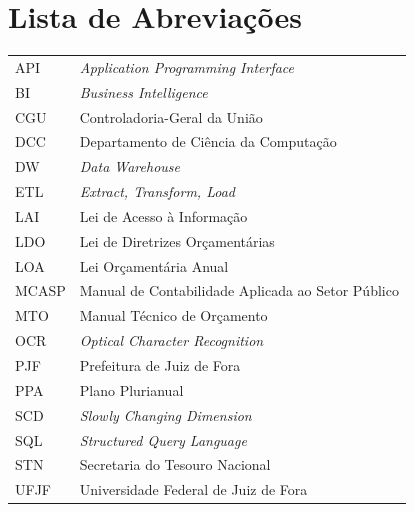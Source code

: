 \documentclass[a4paper,12pt]{monografia}
\theoremstyle{plain}
\theoremstyle{definition}
\theoremstyle{remark}
\begin{document}
\tableofcontents \thispagestyle{empty} \listoffigures
\thispagestyle{empty} \listoftables \thispagestyle{empty}

\chapter*{Lista de Abreviações} 
\doublespacing  \begin{tabular}{l l}

API   & \textit{Application Programming Interface} \\
BI    & \textit{Business Intelligence} \\
CGU   & Controladoria-Geral da União \\
DCC   & Departamento de Ciência da Computação \\
DW    & \textit{Data Warehouse} \\
ETL   & \textit{Extract, Transform, Load} \\
LAI   & Lei de Acesso à Informação \\
LDO   & Lei de Diretrizes Orçamentárias \\
LOA   & Lei Orçamentária Anual \\
MCASP & Manual de Contabilidade Aplicada ao Setor Público \\
MTO   & Manual Técnico de Orçamento \\
OCR   & \textit{Optical Character Recognition} \\
PJF   & Prefeitura de Juiz de Fora \\
PPA   & Plano Plurianual \\
SCD   & \textit{Slowly Changing Dimension} \\
SQL   & \textit{Structured Query Language} \\
STN   & Secretaria do Tesouro Nacional \\
UFJF  & Universidade Federal de Juiz de Fora \\

\end{tabular}  \thispagestyle{empty}

\pagestyle{ruledheader}









\singlespacing



\end{document}
